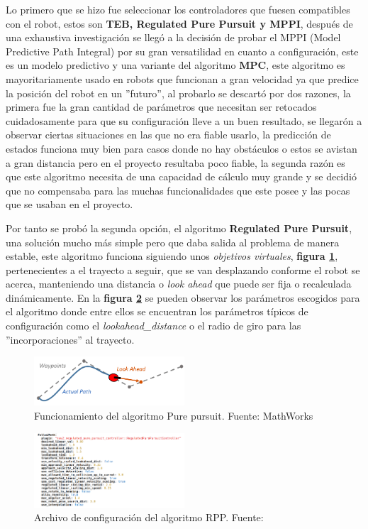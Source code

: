 Lo primero que se hizo fue 
seleccionar los controladores que fuesen compatibles con el robot, estos son \textbf{TEB, Regulated Pure Pursuit y MPPI}, después de una exhaustiva investigación 
se llegó a la decisión de probar el MPPI (Model Predictive Path Integral) por su gran versatilidad en cuanto a configuración, este es un modelo predictivo y una variante del algoritmo \textbf{MPC}, este algoritmo 
es mayoritariamente usado en robots que funcionan a gran velocidad ya que predice la posición del robot en un ''futuro'', al probarlo se descartó por dos 
razones, la primera fue la gran cantidad de parámetros que necesitan ser retocados cuidadosamente para que su configuración lleve a un buen resultado, se llegarón a observar ciertas situaciones en las que no era fiable usarlo, la predicción 
de estados funciona muy bien para casos donde no hay obstáculos o estos se avistan a gran distancia pero en el proyecto resultaba poco fiable, la segunda razón 
es que este algoritmo necesita de una capacidad de cálculo muy grande y se decidió que no compensaba para las muchas funcionalidades que este posee y las pocas 
que se usaban en el proyecto.

Por tanto se probó la segunda opción, el algoritmo \textbf{Regulated Pure Pursuit}, una solución mucho más simple pero 
que daba salida al problema de manera estable, este algoritmo funciona siguiendo unos \textit{objetivos virtuales}, 
\textbf{figura \ref{fig:pure_pursui_teoria}}, pertenecientes a el trayecto a seguir, que se van desplazando conforme el robot se acerca, 
manteniendo una distancia o \textit{look ahead} que puede ser fija o recalculada dinámicamente. En la 
\textbf{figura \ref{fig:rpp_configuracion}} se pueden observar los parámetros escogidos para el algoritmo donde entre ellos se encuentran 
los parámetros típicos de configuración como el \textit{lookahead\_distance} o el radio de giro para las ''incorporaciones'' al trayecto.
\begin{figure}[h]
    \centering
    \includegraphics[width=0.5\textwidth]{images/pure_pursuit_teoria.png}
    \caption{Funcionamiento del algoritmo Pure pursuit. Fuente: MathWorks}
    \label{fig:pure_pursui_teoria}
\end{figure}

\begin{figure}[H]
    \centering
    \includegraphics[width=0.5\textwidth]{images/rpp_configuracion.png}
    \caption{Archivo de configuración del algoritmo RPP. Fuente: \cite{nav2}}
    \label{fig:rpp_configuracion}
\end{figure}

